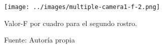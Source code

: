 \documentclass[a4paper,openright,12pt]{report}
\begin{document}
    \begin{figure}[h]
      \centering
        \texttt{[image: ../images/multiple-camera1-f-2.png]}\par
      \caption{Valor-F por cuadro para el segundo rostro.}
        \label{fig:multiple-camera1-precision-1}
      \caption*{Fuente: Autoría propia}
    \end{figure}

\printglossary


{}
\end{document}
